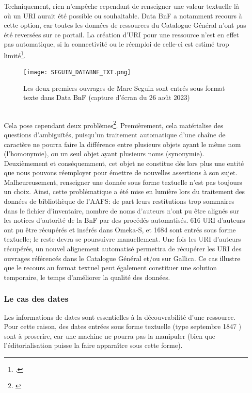 \documentclass[a4paper,12pt,twoside]{book}
\begin{document}
Techniquement, rien n'empêche cependant de renseigner une valeur textuelle là où un URI aurait été possible ou souhaitable. Data BnF a notamment recours à cette option, car toutes les données de ressources du Catalogue Général n'ont pas été reversées sur ce portail. La création d'URI pour une ressource n'est en effet pas automatique, si la connectivité ou le réemploi de celle-ci est estimé trop limité\footnote{\cite[p.~3]{ministeredelacultureetdelacommunicationIdentifiantsPerennesPour2014}.}.\\ 
\begin{figure}[h]
    \centering
    \texttt{[image: SEGUIN\_DATABNF\_TXT.png]}
    \caption{Les deux premiers ouvrages de Marc Seguin sont entrés sous format texte dans Data BnF (capture d'écran du 26 août 2023)}
    \label{fig:enter-label}
\end{figure}\\
Cela pose cependant deux problèmes\footnote{\cite[p.~76]{bermesWebSemantiqueBibliotheque2013}}. Premièrement, cela matérialise des questions d’ambiguïtés, puisqu'un traitement automatique d'une chaîne de caractère ne pourra faire la différence entre plusieurs objets ayant le même nom (l'homonymie), ou un seul objet ayant plusieurs noms (synonymie). Deuxièmement et conséquemment, cet objet ne constitue dès lors plus une entité que nous pouvons réemployer pour émettre de nouvelles assertions à son sujet.\\


Malheureusement, renseigner une donnée sous forme textuelle n'est pas toujours un choix. Ainsi, cette problématique a été mise en lumière lors du traitement des données de bibliothèque de l'AAFS: de part leurs restitutions trop sommaires dans le fichier d'inventaire, nombre de noms d'auteurs n'ont pu être alignés sur les notices d'autorité de la BnF par des procédés automatisés. 616 URI d'auteurs ont pu être récupérés et insérés dans Omeka-S, et 1684 sont entrés sous forme textuelle; le reste devra se poursuivre manuellement. Une fois les URI d'auteurs récupérés, un nouvel alignement automatisé permettra de récupérer les URI des ouvrages référencés dans le Catalogue Général et/ou sur Gallica. Ce cas illustre que le recours au format textuel peut également constituer une solution temporaire, le temps d'améliorer la qualité des données. 


\subsubsection{Le cas des dates}
Les informations de dates sont essentielles à la découvrabilité d'une ressource. Pour cette raison, des dates entrées sous forme textuelle (type  septembre 1847 \fg) sont à proscrire, car une machine ne pourra pas la manipuler (bien que l'éditorialisation puisse la faire apparaître sous cette forme).\\
\end{document}
